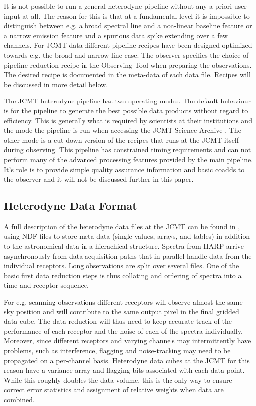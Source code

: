\documentclass[final,authoryear,5p,times,twocolumn]{elsarticle}
\begin{document}
It is not possible to run a general heterodyne pipeline without any a
priori user-input at all. The reason for this is that at a fundamental
level it is impossible to distinguish between e.g. a broad spectral
line and a non-linear baseline feature or a narrow emission feature
and a spurious data spike extending over a few channels. For JCMT data
different pipeline recipes have been designed optimized towards
e.g. the broad and narrow line case. The observer specifies the choice
of pipeline reduction recipe in the Observing Tool when preparing the
observations. The desired recipe is documented in the meta-data of
each data file. Recipes will be discussed in more detail below.

The JCMT heterodyne pipeline has two operating modes. The default
behaviour is for the pipeline to generate the best possible data
products without regard to efficiency. This is generally what is
required by scientists at their institutions and the mode the pipeline is run 
when accessing the JCMT Science Archive
\citep{2008ASPC..394..135G,2008ASPC..394..565J}. The other mode is a
cut-down version of the recipes that runs at the JCMT itself during
observing. This pipeline has constrained timing requirements and can
not perform many of the advanced processing features provided by the
main pipeline. It's role is to provide simple quality assurance
information and basic coadds to the observer and it will not be
discussed further in this paper.


\subsection{Heterodyne Data Format}
\label{sec:format}

A full description of the heterodyne data files at the JCMT can be
found in \citet{OCS_ICD_022}, using NDF
\citep{NDF,1988STARB...2...11C,P91_adassxxiii} files to store
meta-data (single values, arrays, and tables) in addition to the astronomical
data in a hierachical structure. Spectra from HARP arrive
asynchronously from data-acquisition paths that in parallel handle
data from the individual receptors. Long observations are split
over several files. One of the basic first data reduction steps is thus
collating and ordering of spectra into a time and receptor sequence.

For e.g. scanning observations different receptors will observe almost
the same sky position and will contribute to the same output pixel in
the final gridded data-cube. The data reduction will thus need to keep
accurate track of the performance of each receptor and the noise of
each of the spectra individually. Moreover, since different receptors
and varying channels may intermittently have problems, such as
interference, flagging and noise-tracking may need to be propagated on a
per-channel basis. Heterodyne data cubes at the JCMT for this reason
have a variance array and flagging bits associated with each data point.
While this roughly doubles the data volume, this is the only way to
ensure correct error statistics and assignment of relative weights
when data are combined.
\end{document}
